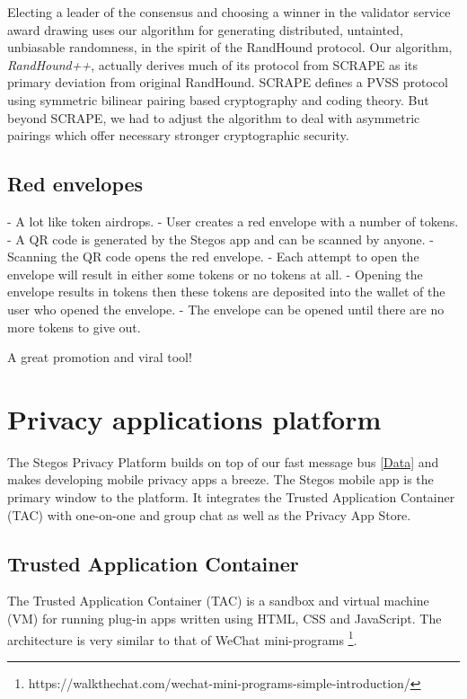 \documentclass[a4paper, 10pt, conference]{ieeeconf}
\begin{document}
Electing a leader of the consensus and choosing a winner in the validator service award drawing uses our algorithm for generating distributed, untainted, unbiasable randomness, in the spirit of the RandHound protocol\cite{c12}. Our algorithm, \textit{RandHound++}, actually derives much of its protocol from SCRAPE\cite{c13} as its primary deviation from original RandHound. SCRAPE defines a PVSS\cite{c14} protocol using symmetric bilinear pairing based cryptography and coding theory. But beyond SCRAPE, we had to adjust the algorithm to deal with asymmetric pairings which offer necessary stronger cryptographic security.

\subsection{Red envelopes}\label{RedEnvelopes}

- A lot like token airdrops. 
- User creates a red envelope with a number of tokens.
- A QR code is generated by the Stegos app and can be scanned by anyone. 
- Scanning the QR code opens the red envelope.
- Each attempt to open the envelope will result in either some tokens or no tokens at all.
- Opening the envelope results in tokens then these tokens are deposited into the wallet of the user who opened the envelope.
- The envelope can be opened until there are no more tokens to give out.

A great promotion and viral tool!

\section{Privacy applications platform}\label{PrivacyPlatform}

The Stegos Privacy Platform builds on top of our fast message bus \ref{Data} and makes developing mobile privacy apps a breeze. The Stegos mobile app is the primary window to the platform. It integrates the Trusted Application Container (TAC) with one-on-one and group chat as well as the  Privacy App Store. 

\subsection{Trusted Application Container}\label{TAC}
The Trusted Application Container (TAC) is a sandbox and virtual machine (VM) for running plug-in apps written using HTML, CSS and JavaScript. The architecture is very similar to that of WeChat mini-programs \footnote{https://walkthechat.com/wechat-mini-programs-simple-introduction/}.
\end{document}
